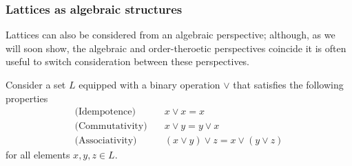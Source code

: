 \subsubsection{Lattices as algebraic structures}
\label{subsubsection:lattices-as-algebraic-structures}

Lattices can also be considered from an algebraic perspective; although, as we will soon show, the algebraic and order-theroetic perspectives coincide it is often useful to switch consideration
between these perspectives.

Consider a set $L$ equipped with a binary operation $\vee$ that satisfies the following properties
%
\begin{align}
  \text{(Idempotence)}   & \quad x \vee x = x \label{eq:idempotence}                            \\
  \text{(Commutativity)} & \quad x \vee y = y \vee x \label{eq:commutativity}                   \\
  \text{(Associativity)} & \quad (x \vee y) \vee z = x \vee (y \vee z) \label{eq:associativity}
\end{align}
for all elements $x,y,z \in L$.

